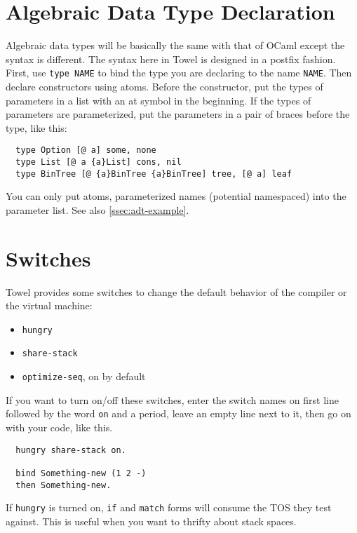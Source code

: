 \documentclass{book}
\begin{document}
\section{Algebraic Data Type Declaration}
\label{ssec:atdf}

Algebraic data types will be basically the same with that of OCaml except the syntax is different. The syntax here in Towel is designed in a postfix fashion. First, use \texttt{type NAME} to bind the type you are declaring to the name \texttt{NAME}. Then declare constructors using atoms. Before the constructor, put the types of parameters in a list with an at symbol in the beginning. If the types of parameters are parameterized, put the parameters in a pair of braces before the type, like this:
\begin{verbatim}
  type Option [@ a] some, none
  type List [@ a {a}List] cons, nil
  type BinTree [@ {a}BinTree {a}BinTree] tree, [@ a] leaf
\end{verbatim}

You can only put atoms, parameterized names (potential namespaced) into the parameter list. See also \autoref{ssec:adt-example}.

\section{Switches}
\label{sec:switches}

Towel provides some switches to change the default behavior of the compiler or the virtual machine:
\begin{itemize}
\item \texttt{hungry}
\item \texttt{share-stack}
\item \texttt{optimize-seq}, on by default
\end{itemize}

If you want to turn on/off these switches, enter the switch names on first line followed by the word \texttt{on} and a period, leave an empty line next to it, then go on with your code, like this.

\begin{verbatim}
  hungry share-stack on.

  bind Something-new (1 2 -)
  then Something-new.
\end{verbatim}

If \texttt{hungry} is turned on, \texttt{if} and \texttt{match} forms will consume the TOS they test against. This is useful when you want to thrifty about stack spaces.
\end{document}
